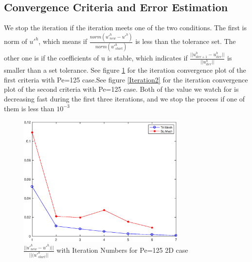 \documentclass[10pt]{article}
\begin{document}
\subsection{Convergence Criteria and Error Estimation}
\label{error}
We stop the iteration if the iteration meets one of the two conditions. The first is norm of $u'^{h}$, which means if $\frac{norm(u'^{h}_{new}-u'^{h})}{norm(u'^{h}_{start})}$ is less than the tolerance set. The other one is if the coefficients of u is stable, which indicates if $\frac{||u^{h}_{iter+1}-u^{h}_{iter}||}{||u^{h}_{iter}||}$ is smaller than a set tolerance.  See figure \ref{Iteration} for the iteration convergence plot of the first criteria with Pe=125 case.See figure \ref{Iteration2} for the iteration convergence plot of the second criteria with Pe=125 case. Both of the value we watch for is decreasing fast during the first three iterations, and we stop the process if one of them is less than $10^{-3}$\\

\begin{figure}[h!]
	\begin{center}
	\includegraphics[width=0.75\textwidth, clip]{./figure/uprime.eps}
	\end{center}
		\vspace{0mm}
    \caption{$\frac{||u'^{h}_{new}-u'^{h})||}{||(u'^{h}_{start}||}$ with Iteration Numbers for Pe=125 2D case}
  	\label{Iteration}
\end{figure}
\end{document}

